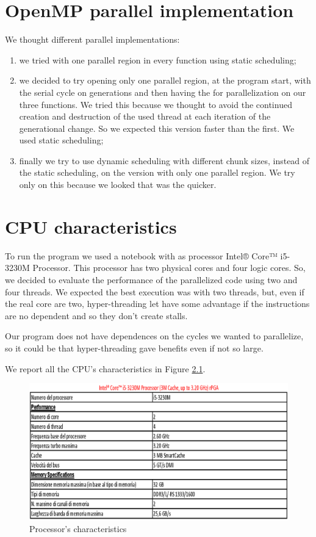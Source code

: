 \documentclass[a4paper,11pt,twoside]{report}
\begin{document}
\chapter{OpenMP parallel implementation}
We thought different parallel implementations:
\begin{enumerate}
\item we tried with one parallel region in every function using static scheduling;
	\item we decided to try opening only one parallel region, at the program start, with the serial cycle on generations and then having the for parallelization on our three functions. We tried this because we thought to avoid the continued creation and destruction of the used thread at each iteration of the generational change. So we expected this version faster than the first. We used static scheduling;
	\item finally we try to use dynamic scheduling with different chunk sizes, instead of the static scheduling, on the version with only one parallel region. We try only on this because we looked that was the quicker.
\end{enumerate}



\chapter{CPU characteristics}
To run the program we used a notebook with as processor Intel® Core™ i5-3230M Processor.
This processor has two physical cores and four logic cores. So, we decided to evaluate the performance of the parallelized code using two and four threads. We expected the best execution was with two threads, but, even if the real core are two, hyper-threading let have some advantage if the instructions are no dependent and so they don't create stalls.

\noindent Our program does not have dependences on the cycles we wanted to parallelize, so it could be that hyper-threading gave benefits even if not so large.

\noindent We report all the CPU's characteristics in Figure \ref{fig:2}.

\begin{figure}
	\centering
	\includegraphics[scale = 0.5]{i5.eps}
	\caption{Processor's characteristics} \label{fig:2}
\end{figure}
\end{document}
